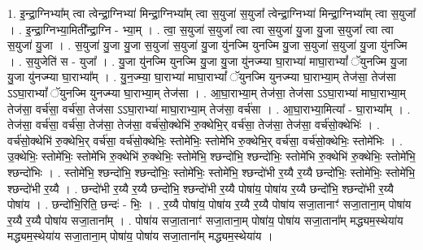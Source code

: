\documentclass[17pt]{extarticle}
\begin{document}
1. इ॒न्द्रा॒ग्निभ्या᳚म् त्वा त्वेन्द्रा॒ग्निभ्या॑ मिन्द्रा॒ग्निभ्या᳚म् त्वा स॒युजा॑ स॒युजा᳚ त्वेन्द्रा॒ग्निभ्या॑ मिन्द्रा॒ग्निभ्या᳚म् त्वा स॒युजा᳚ । . इ॒न्द्रा॒ग्निभ्या॒मिती᳚न्द्रा॒ग्नि - भ्या॒म् । . त्वा॒ स॒युजा॑ स॒युजा᳚ त्वा त्वा स॒युजा॑ यु॒जा यु॒जा स॒युजा᳚ त्वा त्वा स॒युजा॑ यु॒जा । . स॒युजा॑ यु॒जा यु॒जा स॒युजा॑ स॒युजा॑ यु॒जा यु॑नज्मि युनज्मि यु॒जा स॒युजा॑ स॒युजा॑ यु॒जा यु॑नज्मि । . स॒युजेति॑ स - युजा᳚ । . यु॒जा यु॑नज्मि युनज्मि यु॒जा यु॒जा यु॑नज्म्या घा॒राभ्या॑ माघा॒राभ्यां᳚ ॅयुनज्मि यु॒जा यु॒जा यु॑नज्म्या घा॒राभ्या᳚म् । . यु॒न॒ज्म्या॒ घा॒राभ्या॑ माघा॒राभ्यां᳚ ॅयुनज्मि युनज्म्या घा॒राभ्या॒म् तेज॑सा॒ तेज॑सा ऽऽघा॒राभ्यां᳚ ॅयुनज्मि युनज्म्या घा॒राभ्या॒म् तेज॑सा । . आ॒घा॒राभ्या॒म् तेज॑सा॒ तेज॑सा ऽऽघा॒राभ्या॑ माघा॒राभ्या॒म् तेज॑सा॒ वर्च॑सा॒ वर्च॑सा॒ तेज॑सा ऽऽघा॒राभ्या॑ माघा॒राभ्या॒म् तेज॑सा॒ वर्च॑सा । . आ॒घा॒राभ्या॒मित्या᳚ - घा॒राभ्या᳚म् । . तेज॑सा॒ वर्च॑सा॒ वर्च॑सा॒ तेज॑सा॒ तेज॑सा॒ वर्च॑सो॒क्थेभि॑ रु॒क्थेभि॒र् वर्च॑सा॒ तेज॑सा॒ तेज॑सा॒ 
वर्च॑सो॒क्थेभिः॑ । . वर्च॑सो॒क्थेभि॑ रु॒क्थेभि॒र् वर्च॑सा॒ वर्च॑सो॒क्थेभिः॒ स्तोमे॑भिः॒ स्तोमे॑भि रु॒क्थेभि॒र् वर्च॑सा॒ 
वर्च॑सो॒क्थेभिः॒ स्तोमे॑भिः । . उ॒क्थेभिः॒ स्तोमे॑भिः॒ स्तोमे॑भि रु॒क्थेभि॑ रु॒क्थेभिः॒ स्तोमे॑भि॒ श्छन्दो॑भि॒ श्छन्दो॑भिः॒ स्तोमे॑भि रु॒क्थेभि॑ रु॒क्थेभिः॒ स्तोमे॑भि॒ श्छन्दो॑भिः । . स्तोमे॑भि॒ श्छन्दो॑भि॒ श्छन्दो॑भिः॒ स्तोमे॑भिः॒ स्तोमे॑भि॒ श्छन्दो॑भी र॒य्यै र॒य्यै छन्दो॑भिः॒ स्तोमे॑भिः॒ स्तोमे॑भि॒ श्छन्दो॑भी र॒य्यै । . छन्दो॑भी र॒य्यै र॒य्यै छन्दो॑भि॒ श्छन्दो॑भी र॒य्यै पोषा॑य॒ पोषा॑य र॒य्यै छन्दो॑भि॒ श्छन्दो॑भी र॒य्यै पोषा॑य । . छन्दो॑भि॒रिति॒ छन्दः॑ - भिः॒ । . र॒य्यै पोषा॑य॒ पोषा॑य र॒य्यै र॒य्यै पोषा॑य सजा॒तानाꣳ॑ सजा॒ताना॒म् पोषा॑य र॒य्यै र॒य्यै पोषा॑य सजा॒ताना᳚म् । . पोषा॑य सजा॒तानाꣳ॑ सजा॒ताना॒म् पोषा॑य॒ पोषा॑य सजा॒ताना᳚म् मद्ध्यम॒स्थेया॑य मद्ध्यम॒स्थेया॑य सजा॒ताना॒म् पोषा॑य॒ पोषा॑य सजा॒ताना᳚म् मद्ध्यम॒स्थेया॑य । \newline
\end{document}
